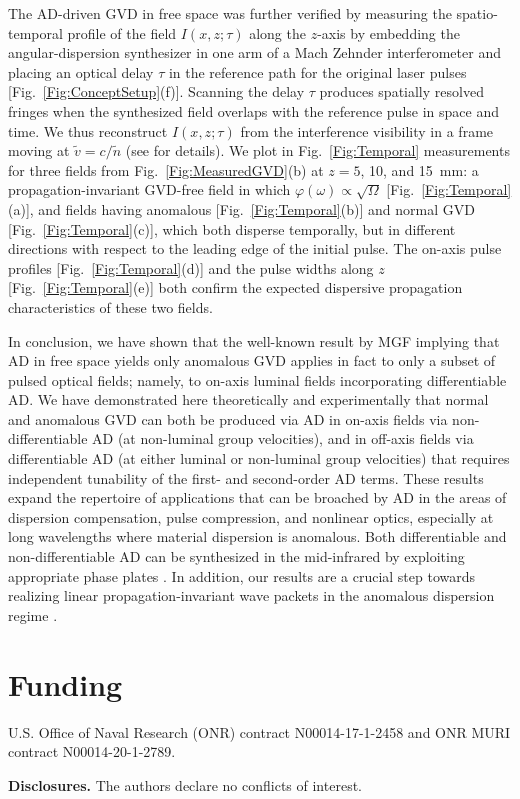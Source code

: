 \documentclass[reprint,
 amsmath,amssymb,
 aps,
]{revtex4-2}
\begin{document}
The AD-driven GVD in free space was further verified by measuring the spatio-temporal profile of the field $I(x,z;\tau)$ along the $z$-axis by embedding the angular-dispersion synthesizer in one arm of a Mach Zehnder interferometer and placing an optical delay $\tau$ in the reference path for the original laser pulses [Fig.~\ref{Fig:ConceptSetup}(f)]. Scanning the delay $\tau$ produces spatially resolved fringes when the synthesized field overlaps with the reference pulse in space and time. We thus reconstruct $I(x,z;\tau)$ from the interference visibility in a frame moving at $\widetilde{v}\!=\!c/\widetilde{n}$ (see \cite{Kondakci19NC,Bhaduri19Optica,Yessenov19OE} for details). We plot in Fig.~\ref{Fig:Temporal} measurements for three fields from Fig.~\ref{Fig:MeasuredGVD}(b) at $z\!=\!5$, 10, and 15~mm: a propagation-invariant GVD-free field in which $\varphi(\omega)\!\propto\!\sqrt{\Omega}$ [Fig.~\ref{Fig:Temporal}(a)], and fields having anomalous [Fig.~\ref{Fig:Temporal}(b)] and normal GVD [Fig.~\ref{Fig:Temporal}(c)], which both disperse temporally, but in different directions with respect to the leading edge of the initial pulse. The on-axis pulse profiles [Fig.~\ref{Fig:Temporal}(d)] and the pulse widths along $z$ [Fig.~\ref{Fig:Temporal}(e)] both confirm the expected dispersive propagation characteristics of these two fields.



In conclusion, we have shown that the well-known result by MGF \cite{Martinez84JOSAA} implying that AD in free space yields only anomalous GVD applies in fact to only a subset of pulsed optical fields; namely, to on-axis luminal fields incorporating differentiable AD. We have demonstrated here theoretically and experimentally that normal and anomalous GVD can both be produced via AD in on-axis fields via non-differentiable AD (at non-luminal group velocities), and in off-axis fields via differentiable AD (at either luminal or non-luminal group velocities) that requires independent tunability of the first- and second-order AD terms. These results expand the repertoire of applications that can be broached by AD in the areas of dispersion compensation, pulse compression, and nonlinear optics, especially at long wavelengths where material dispersion is anomalous. Both differentiable and non-differentiable AD can be synthesized in the mid-infrared \cite{Yessenov20OSAC} by exploiting appropriate phase plates \cite{Kondakci18OE,Bhaduri19OL}. In addition, our results are a crucial step towards realizing linear propagation-invariant wave packets in the anomalous dispersion regime \cite{Longhi03PRE,Porras04PRE,Longhi04OL,Malaguti08OL,Mills12PRA}.

\section*{Funding}
U.S. Office of Naval Research (ONR) contract N00014-17-1-2458 and ONR MURI contract N00014-20-1-2789.

\vspace{2mm}
\noindent
\textbf{Disclosures.} The authors declare no conflicts of interest.


\end{document}
